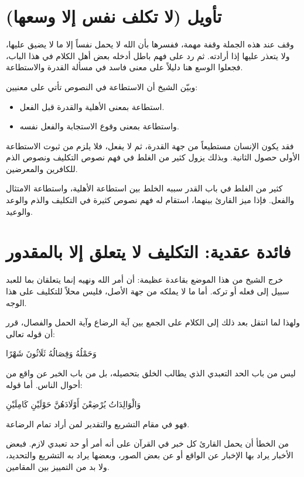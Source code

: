 \section{تأويل (لا تكلف نفس إلا وسعها)}
وقف  عند هذه الجملة وقفة مهمة، ففسرها بأن الله لا يحمل نفساً إلا ما لا يضيق عليها، ولا يتعذر عليها إذا أرادته. ثم رد على فهم باطل أدخله بعض أهل الكلام في هذا الباب، فجعلوا الوسع هنا دليلاً على معنى فاسد في مسألة القدرة والاستطاعة.

وبيّن الشيخ أن الاستطاعة في النصوص تأتي على معنيين:
\begin{itemize}
    \item استطاعة بمعنى الأهلية والقدرة قبل الفعل.
    \item واستطاعة بمعنى وقوع الاستجابة والفعل نفسه.
\end{itemize}

فقد يكون الإنسان مستطيعاً من جهة القدرة، ثم لا يفعل، فلا يلزم من ثبوت الاستطاعة الأولى حصول الثانية. وبذلك يزول كثير من الغلط في فهم نصوص التكليف ونصوص الذم للكافرين والمعرضين.

\begin{fawaid}
كثير من الغلط في باب القدر سببه الخلط بين استطاعة الأهلية، واستطاعة الامتثال والفعل. فإذا ميز القارئ بينهما، استقام له فهم نصوص كثيرة في التكليف والذم والوعد والوعيد.
\end{fawaid}

\section{فائدة عقدية: التكليف لا يتعلق إلا بالمقدور}
خرج الشيخ من هذا الموضع بقاعدة عظيمة: أن أمر الله ونهيه إنما يتعلقان بما للعبد سبيل إلى فعله أو تركه. أما ما لا يملكه من جهة الأصل، فليس محلاً للتكليف على هذا الوجه.

ولهذا لما انتقل  بعد ذلك إلى الكلام على الجمع بين آية الرضاع وآية الحمل والفصال، قرر أن قوله تعالى: \begin{ayah}وَحَمْلُهُ وَفِصَالُهُ ثَلَاثُونَ شَهْرًا\end{ayah} ليس من باب الحد التعبدي الذي يطالب الخلق بتحصيله، بل من باب الخبر عن واقع من أحوال الناس. أما قوله: \begin{ayah}وَالْوَالِدَاتُ يُرْضِعْنَ أَوْلَادَهُنَّ حَوْلَيْنِ كَامِلَيْنِ\end{ayah} فهو في مقام التشريع والتقدير لمن أراد تمام الرضاعة.

\begin{fawaid}
من الخطأ أن يحمل القارئ كل خبر في القرآن على أنه أمر أو حد تعبدي لازم. فبعض الأخبار يراد بها الإخبار عن الواقع أو عن بعض الصور، وبعضها يراد به التشريع والتحديد، ولا بد من التمييز بين المقامين.
\end{fawaid}

